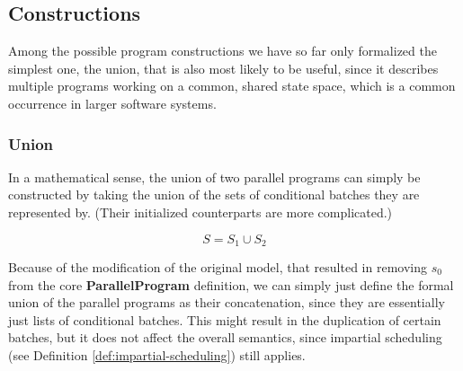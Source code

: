 \subsection{Constructions}

Among the possible program constructions we have so far only formalized the simplest one, the union, that is also most likely to be useful, since it describes multiple programs working on a common, shared state space, which is a common occurrence in larger software systems.

\subsubsection{Union}

In a mathematical sense, the union of two parallel programs can simply be constructed by taking the union of the sets of conditional batches they are represented by. (Their initialized counterparts are more complicated.) %

\begin{equation}
  S = S_{1} \cup S_{2}
\end{equation}

Because of the modification of the original model, that resulted in removing $s_0$ from the core \textbf{ParallelProgram} definition, we can simply just define the formal union of the parallel programs as their concatenation, since they are essentially just lists of conditional batches. This might result in the duplication of certain batches, but it does not affect the overall semantics, since impartial scheduling (see Definition \ref{def:impartial-scheduling}) still applies.

